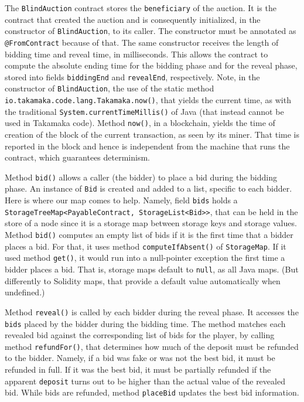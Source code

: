 The \texttt{BlindAuction} contract stores the \texttt{beneficiary} of the auction.
It is the contract that created the auction and is consequently
initialized, in the constructor of \texttt{BlindAuction}, to its caller.
The constructor must be annotated as \texttt{@FromContract} because of that.
The same constructor receives the length of bidding time and reveal time, in
milliseconds. This allows the contract to compute the absolute ending time
for the bidding phase and for the reveal phase, stored into fields
\texttt{biddingEnd} and \texttt{revealEnd}, respectively.
Note, in the constructor of \texttt{BlindAuction}, the
use of the static method \texttt{io.takamaka.code.lang.Takamaka.now()}, that yields the
current time, as with the traditional \texttt{System.currentTimeMillis()} of Java
(that instead cannot be used in Takamaka code). Method \texttt{now()}, in a blockchain, yields the
time of creation of the block of the current transaction, as seen by its miner.
That time is reported in the block and hence is independent from the
machine that runs the contract, which guarantees determinism.

Method \texttt{bid()} allows a caller (the bidder) to place a bid during the bidding phase.
An instance of \texttt{Bid} is created and added to a list, specific to each
bidder. Here is where our map comes to help. Namely, field
\texttt{bids} holds a \texttt{StorageTreeMap<PayableContract, StorageList<Bid>>},
that can be held in the store of a node since it is a storage map between storage keys
and storage values. Method \texttt{bid()} computes an empty list of bids if it is the
first time that a bidder places a bid. For that, it uses method
\texttt{computeIfAbsent()} of \texttt{StorageMap}. If it used method \texttt{get()}, it would
run into a null-pointer exception the first time a bidder places a bid.
That is, storage maps default to \texttt{null}, as all Java maps. (But differently to
Solidity maps, that provide a default value automatically when undefined.)

Method \texttt{reveal()} is called by each bidder during the reveal phase.
It accesses the \texttt{bids} placed by the bidder during the bidding time.
The method matches each revealed bid against the corresponding
list of bids for the player, by calling
method \texttt{refundFor()}, that determines how much of the deposit must be
refunded to the bidder. Namely, if a bid was fake or was not the best bid,
it must be refunded in full. If it was the best bid, it must be partially refunded
if the apparent \texttt{deposit} turns out to be higher than the actual value of the
revealed bid. While bids are refunded, method \texttt{placeBid} updates
the best bid information.

